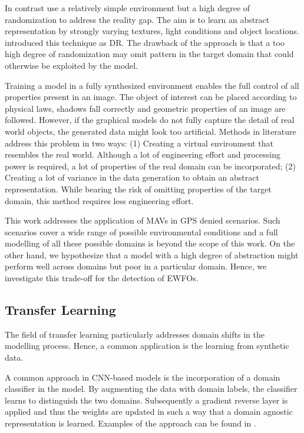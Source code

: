 In contrast \cite{Sadeghi2016, Tobin2017, Tremblay2018a} use a relatively simple environment but a high degree of randomization to address the reality gap. The aim is to learn an abstract representation by strongly varying textures, light conditions and object locations. \citeauthor{Tobin2017} introduced this technique as \ac{DR}. The drawback of the approach is that a too high degree of randomization may omit pattern in the target domain that could otherwise be exploited by the model. 

Training a model in a fully synthesized environment enables the full control of all properties present in an image. The object of interest can be placed according to physical laws, shadows fall correctly and geometric properties of an image are followed. However, if the graphical models do not fully capture the detail of real world objects, the generated data might look too artificial. Methods in literature address this problem in two ways: (1) Creating a virtual environment that resembles the real world. Although a lot of engineering effort and processing power is required, a lot of properties of the real domain can be incorporated; (2) Creating a lot of variance in the data generation to obtain an abstract representation. While bearing the risk of omitting properties of the target domain, this method requires less engineering effort.

This work addresses the application of \acp{MAV} in \ac{GPS} denied scenarios. Such scenarios cover a wide range of possible environmental conditions and a full modelling of all these possible domains is beyond the scope of this work. On the other hand, we hypothesize that a model with a high degree of abstraction might perform well across domains but poor in a particular domain. Hence, we investigate this trade-off for the detection of \acp{EWFO}.


\subsection{Transfer Learning}

The field of transfer learning particularly addresses domain shifts in the modelling process. Hence, a common application is the learning from synthetic data.

A common approach in \ac{CNN}-based models is the incorporation of a domain classifier in the model. By augmenting the data with domain labels, the classifier learns to distinguish the two domains. Subsequently a gradient reverse layer is applied and thus the weights are updated in such a way that a domain agnostic representation is learned. Examples of the approach can be found in \cite{Chen2018c} \cite{Xu2017}.

